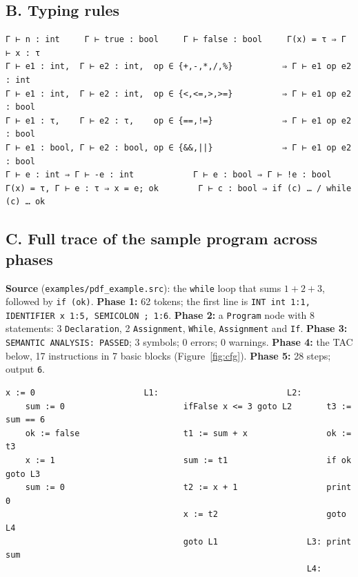 \documentclass[11pt,letterpaper]{article}
\newcommand{\code}[1]{\texttt{#1}}
\begin{document}
\subsection*{B. Typing rules}
\begin{Verbatim}
Γ ⊢ n : int     Γ ⊢ true : bool     Γ ⊢ false : bool     Γ(x) = τ ⇒ Γ ⊢ x : τ
Γ ⊢ e1 : int,  Γ ⊢ e2 : int,  op ∈ {+,-,*,/,%}          ⇒ Γ ⊢ e1 op e2 : int
Γ ⊢ e1 : int,  Γ ⊢ e2 : int,  op ∈ {<,<=,>,>=}          ⇒ Γ ⊢ e1 op e2 : bool
Γ ⊢ e1 : τ,    Γ ⊢ e2 : τ,    op ∈ {==,!=}              ⇒ Γ ⊢ e1 op e2 : bool
Γ ⊢ e1 : bool, Γ ⊢ e2 : bool, op ∈ {&&,||}              ⇒ Γ ⊢ e1 op e2 : bool
Γ ⊢ e : int ⇒ Γ ⊢ -e : int            Γ ⊢ e : bool ⇒ Γ ⊢ !e : bool
Γ(x) = τ, Γ ⊢ e : τ ⇒ x = e; ok        Γ ⊢ c : bool ⇒ if (c) … / while (c) … ok
\end{Verbatim}

\subsection*{C. Full trace of the sample program across phases}
\textbf{Source} (\code{examples/pdf\_example.src}): the \code{while} loop that sums $1+2+3$, followed by \code{if (ok)}.
\textbf{Phase 1:} 62 tokens; the first line is \code{INT int 1:1, IDENTIFIER x 1:5, SEMICOLON ; 1:6}.
\textbf{Phase 2:} a \code{Program} node with 8 statements: 3 \code{Declaration}, 2 \code{Assignment}, \code{While}, \code{Assignment} and \code{If}.
\textbf{Phase 3:} \code{SEMANTIC ANALYSIS: PASSED}; 3 symbols; 0 errors; 0 warnings.
\textbf{Phase 4:} the TAC below, 17 instructions in 7 basic blocks (Figure~\ref{fig:cfg}).
\textbf{Phase 5:} 28 steps; output \code{6}.
\begin{lstlisting}[language=tac]
    x := 0                      L1:                          L2:
    sum := 0                        ifFalse x <= 3 goto L2       t3 := sum == 6
    ok := false                     t1 := sum + x                ok := t3
    x := 1                          sum := t1                    if ok goto L3
    sum := 0                        t2 := x + 1                  print 0
                                    x := t2                      goto L4
                                    goto L1                  L3: print sum
                                                             L4:
\end{lstlisting}
\end{document}
